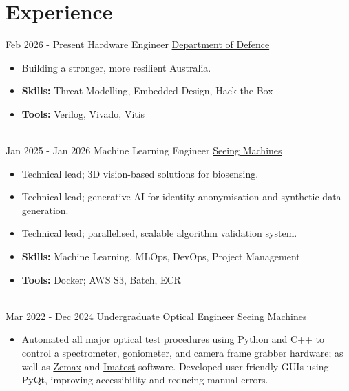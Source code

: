 \documentclass[letterpaper]{twentysecondcv} %
\begin{document}
\makeprofile %
 

\section{Experience}

\begin{twenty} %
\twentyitem
    	{Feb 2026 -}
		{Present}
        {Hardware Engineer}
        {\href{https://www.defence.gov.au}{Department of Defence}}
        {}
        {
        {\begin{itemize}
        \item Building a stronger, more resilient Australia.
        \item \textbf{Skills:} Threat Modelling, Embedded Design, Hack the Box
        \item \textbf{Tools:} Verilog, Vivado, Vitis 
    \end{itemize}}
        }
    \\   
    \twentyitem
   		{Jan 2025 -}
		{Jan 2026}
        {Machine Learning Engineer}
        {\href{https://seeingmachines.com}{Seeing Machines}}
        {}
        {
        {\begin{itemize}
        \item Technical lead; 3D vision-based solutions for biosensing.
        \item Technical lead; generative AI for identity anonymisation and synthetic data generation.
        \item Technical lead; parallelised, scalable algorithm validation system.
        \item \textbf{Skills:} Machine Learning,  MLOps, DevOps, Project Management
        \item \textbf{Tools:} Docker; AWS S3, Batch, ECR
    \end{itemize}}
        }
     \\
     \twentyitem
   		{Mar 2022 -}
		{Dec 2024}
        {Undergraduate Optical Engineer}
        {\href{https://seeingmachines.com}{Seeing Machines}}
        {}
        {
        \begin{itemize}
        \item Automated all major optical test procedures using Python and C++ to control a spectrometer, goniometer, and camera frame grabber hardware; as well as \href{https://www.ansys.com/products/optics/ansys-zemax-opticstudio}{Zemax} and \href{https://www.imatest.com}{Imatest} software. Developed user-friendly GUIs using PyQt, improving accessibility and reducing manual errors.

\end{itemize}}
\end{twenty}
\end{document}
